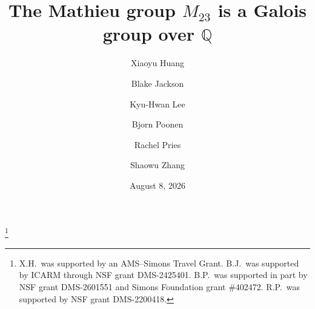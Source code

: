 \documentclass[12pt,reqno]{amsart}
\newcommand{\Q}{\mathbb{Q}}
\theoremstyle{definition}
\theoremstyle{remark}
\begin{document}
\title{The Mathieu group $M_{23}$ is a Galois group over $\Q$}



\author[X. Huang]{Xiaoyu Huang}
\address{Department of Mathematics, Temple University, Philadelphia, PA 19122, USA} 

\author[B. Jackson]{Blake Jackson}
\address{Institute for Computer-Aided Reasoning in Mathematics, Carnegie Mellon University, Pittsburgh, PA 15213, USA}

\author[K.-H. Lee]{Kyu-Hwan Lee}
\address{Department of Mathematics, University of Connecticut, Storrs, CT 06269, USA \hfill \break \indent Korea Institute for Advanced Study, Seoul 02455, Republic of Korea}

\author[B. Poonen]{Bjorn Poonen}
\address{Department of Mathematics, Massachusetts Institute of Technology, Cambridge, MA 02139-4307, USA}

\author[R. Pries]{Rachel Pries}
\address{Department of Mathematics, Colorado State University, Fort Collins, CO 80523, USA}

\author[S. Zhang]{Shaowu Zhang}
\address{Department of Mathematics, California Institute of Technology, Pasadena, CA 91125, USA}

\thanks{X.H.\ was supported by an AMS--Simons Travel Grant. B.J.\ was supported by ICARM through NSF grant DMS-2425401. B.P.\ was supported in part by NSF grant DMS-2601551 and Simons Foundation grant \#402472.
R.P.\ was supported by NSF grant DMS-2200418.}

\date{August 8, 2026}
\end{document}
